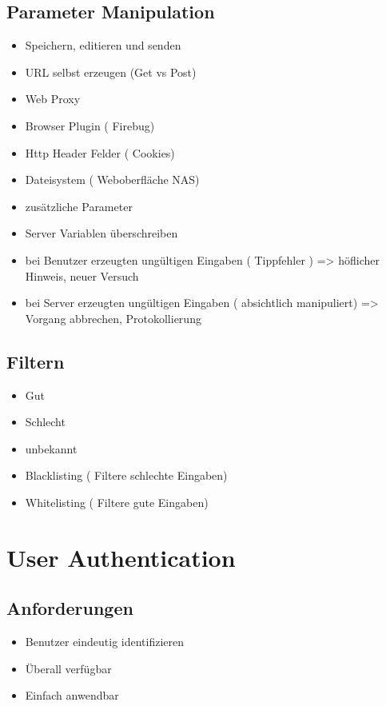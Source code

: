 \subsection*{ Parameter Manipulation}
\begin{itemize}
	\item Speichern, editieren und senden
	\item URL selbst erzeugen (Get vs Post)
	\item Web Proxy
	\item Browser Plugin ( Firebug)
	\item Http Header Felder ( Cookies)
	\item Dateisystem ( Weboberfläche NAS)
	\item zusätzliche Parameter
	\item Server Variablen überschreiben
	\item bei Benutzer erzeugten ungültigen Eingaben ( Tippfehler ) => höflicher Hinweis, neuer Versuch
	\item bei Server erzeugten ungültigen Eingaben ( absichtlich manipuliert) => Vorgang abbrechen, Protokollierung
\end{itemize}

\subsection*{ Filtern}
\begin{itemize}
	\item Gut
	\item Schlecht
	\item unbekannt
	\item Blacklisting ( Filtere schlechte Eingaben)
	\item Whitelisting ( Filtere gute Eingaben)
\end{itemize}



\section*{User Authentication}
\subsection*{ Anforderungen}
\begin{itemize}
	\item Benutzer eindeutig identifizieren
	\item Überall verfügbar 
	\item Einfach anwendbar
\end{itemize}
